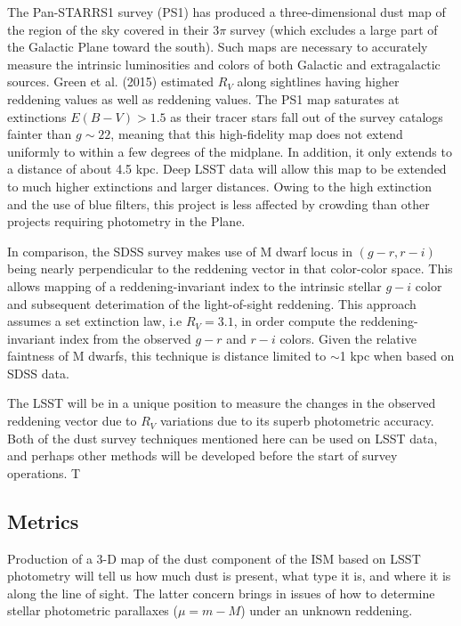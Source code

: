 The Pan-STARRS1 survey (PS1) has
produced a three-dimensional dust map of the region of the sky covered
in their 3$\pi$ survey (which excludes a large part of the Galactic
Plane toward the south). Such maps are necessary to accurately measure
the intrinsic luminosities and colors of both Galactic and
extragalactic sources. 
Green et al. (2015) estimated $R_V$ along sightlines having higher 
reddening values as well as reddening values.
The PS1 map saturates at
extinctions $E(B-V) > 1.5$ as their tracer stars fall out of the
survey catalogs fainter than $g\sim 22$, meaning that this
high-fidelity map does not extend uniformly to within a few degrees of
the midplane. In addition, it only extends to a distance of about 4.5
kpc. Deep LSST data will allow this map to be extended to much higher
extinctions and larger distances. Owing to the high extinction and the
use of blue filters, this project is less affected by crowding than
other projects requiring photometry in the Plane. 

In comparison, the SDSS survey makes use of M dwarf locus in $(g-r,r-i)$ being
nearly perpendicular to the reddening vector in that color-color space. This 
allows mapping of a reddening-invariant index to the intrinsic stellar $g-i$ color
and subsequent deterimation of the light-of-sight reddening. This approach assumes
a set extinction law, i.e $R_V = 3.1$, in order compute the reddening-invariant 
index from the observed $g-r$ and $r-i$ colors. Given the relative faintness of M dwarfs,
this technique is distance limited to $\sim$1 kpc when based on SDSS data.

The LSST will be in a unique position to measure the changes in the observed reddening vector
due to $R_V$ variations due to its superb photometric accuracy. 
Both of the dust survey techniques mentioned here can be used on LSST data, and perhaps other 
methods will be developed before the start of survey operations. T


\subsection{Metrics}

\label{sec:\secname:metrics}

Production of a 3-D map of the dust component of the ISM based on LSST photometry will tell us 
how much dust is present, what type it is, and where it is along the line of sight. 
The latter concern brings in issues of how to determine stellar photometric parallaxes ($\mu = m-M$) under
an unknown reddening.

